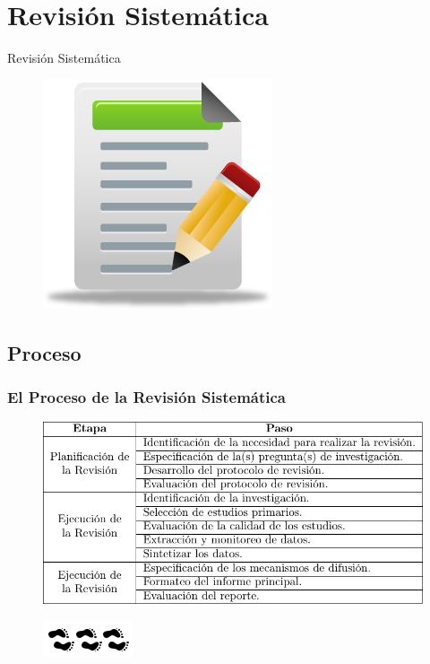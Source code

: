 \documentclass{beamer}
\begin{document}
\section{Revisión Sistemática}
\begin{frame}
\Huge{\centerline{Revisión Sistemática}}
	\begin{figure}
		\begin{center}
			\includegraphics[scale=0.4]{images/2icons/systematicReview.png}
		\end{center}
	\end{figure}
\end{frame}


\subsection{Proceso}
\begin{frame}
	\frametitle{El Proceso de la Revisión Sistemática}	
	\begin{figure}[H]
		\begin{center}
			\includegraphics[scale=0.4]{images/1document/steps.png}
		\end{center}
	\end{figure}
	\begin{figure}[H]
		\begin{center}
			\includegraphics[scale=1]{images/2icons/steps.png}
		\end{center}
	\end{figure}
	
\end{frame}
\end{document}
